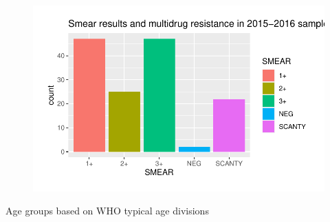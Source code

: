 \documentclass[
]{report}
\begin{document}
\begin{figure}[H]

{\centering \includegraphics{MDR_TB_files/figure-pdf/unnamed-chunk-11-1.pdf}

}

\end{figure}

Age groups based on WHO typical age divisions
\end{document}
